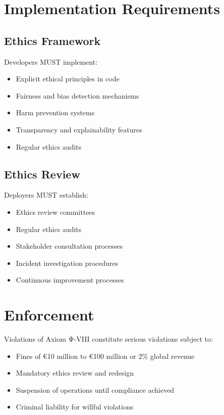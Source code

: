 \vspace{0.5cm}

\section{Implementation Requirements}

\subsection{Ethics Framework}

Developers MUST implement:

\begin{itemize}
    \item Explicit ethical principles in code
    \item Fairness and bias detection mechanisms
    \item Harm prevention systems
    \item Transparency and explainability features
    \item Regular ethics audits
\end{itemize}

\subsection{Ethics Review}

Deployers MUST establish:

\begin{itemize}
    \item Ethics review committees
    \item Regular ethics audits
    \item Stakeholder consultation processes
    \item Incident investigation procedures
    \item Continuous improvement processes
\end{itemize}

\vspace{0.5cm}

\section{Enforcement}

Violations of Axiom Ψ-VIII constitute serious violations subject to:

\begin{itemize}
    \item Fines of €10 million to €100 million or 2\% global revenue
    \item Mandatory ethics review and redesign
    \item Suspension of operations until compliance achieved
    \item Criminal liability for willful violations
\end{itemize}

